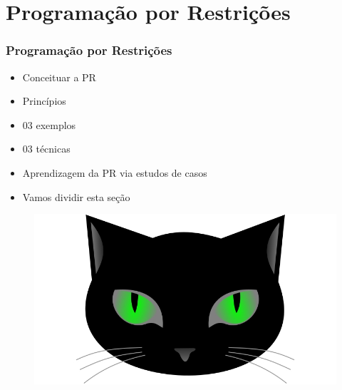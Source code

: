 
       
\section{Programação por Restrições}



\begin{frame}
\frametitle{Programação por Restrições}
\begin{minipage}{0.47\textwidth}
    \begin{itemize}
        \item Conceituar a PR
        \item Princípios
        \item 03 exemplos
        \item 03 técnicas
        \item Aprendizagem da PR via estudos de casos
        \item Vamos dividir esta seção 
    \end{itemize}
\end{minipage}
\begin{minipage}{0.5\textwidth}
\begin{figure}[ht!]
\begin{center}
\includegraphics[width=1.2\textwidth, height=0.40\textheight]{figures/logo_picat_alex.jpg}
\end{center}
\end{figure}
\end{minipage}
\end{frame}



